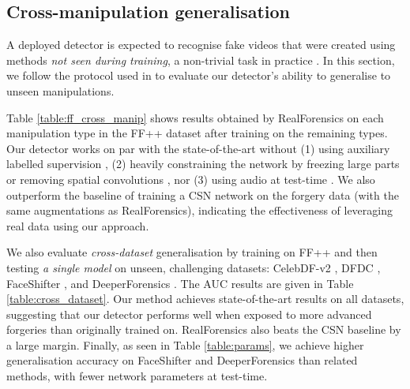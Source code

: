 \documentclass[10pt,twocolumn,letterpaper]{article}
\begin{document}
\subsection{Cross-manipulation generalisation}
A deployed detector is expected to recognise fake videos that were created using methods \textit{not seen during training}, a non-trivial task in practice \cite{li2020face, haliassos2021lips, zheng2021exploring, nguyen2019multi}.  In this section, we follow the protocol used in \cite{haliassos2021lips, li2018exposing, nguyen2019multi} to evaluate our detector's ability to generalise to unseen manipulations.

Table \ref{table:ff_cross_manip} shows results obtained by RealForensics on each manipulation type in the FF++ dataset after training on the remaining types. Our detector works on par with the state-of-the-art without (1) using auxiliary labelled supervision \cite{haliassos2021lips}, (2) heavily constraining the network by freezing large parts \cite{haliassos2021lips} or removing spatial convolutions \cite{zheng2021exploring}, nor (3) using audio at test-time \cite{zhou2021joint}. We also outperform the baseline of training a CSN \cite{tran2019video} network on the forgery data (with the same augmentations as RealForensics), indicating the effectiveness of leveraging real data using our approach.

We also evaluate \textit{cross-dataset} generalisation by training on FF++ and then testing \textit{a single model} on unseen, challenging datasets: CelebDF-v2 \cite{li2020celeb}, DFDC \cite{dolhansky2020deepfake}, FaceShifter \cite{li2020advancing}, and DeeperForensics \cite{jiang2020deeperforensics}. The AUC results are given in Table \ref{table:cross_dataset}. Our method achieves state-of-the-art results on all datasets, suggesting that our detector performs well when exposed to more advanced forgeries than originally trained on. RealForensics also beats the CSN baseline by a large margin. Finally, as seen in Table \ref{table:params}, we achieve higher generalisation accuracy on FaceShifter and DeeperForensics than related methods, with fewer network parameters at test-time.
\end{document}
